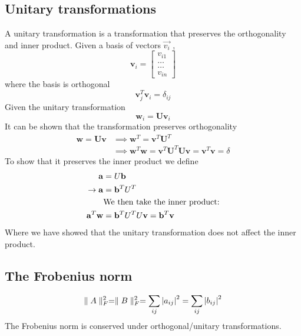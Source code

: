 \documentclass[%
reprint,
amsmath,amssymb,
aps,
]{revtex4-1}
\begin{document}
\subsection{Unitary transformations} \noindent 
A unitary transformation is a transformation that preserves the orthogonality and inner product. Given a basis of vectors $\vec{v_i}$ ,
\begin{equation*}
	\mathbf{v}_i = \begin{bmatrix} v_{i1} \\ \dots \\ \dots \\v_{in} \end{bmatrix}
\end{equation*}
where the basis is orthogonal 
\begin{equation*}
	\mathbf{v}_j^T\mathbf{v}_i = \delta_{ij}
\end{equation*}
Given the unitary transformation 
\begin{equation*}
	\mathbf{w}_i=\mathbf{U}\mathbf{v}_i
\end{equation*}
It can be shown that the transformation preserves orthogonality
\begin{align*}
	\mathbf{w}=\mathbf{U}\mathbf{v} &\implies \mathbf{w}^T=\mathbf{v}^T\mathbf{U}^T \\ &\implies \mathbf{w}^T\mathbf{w} = \mathbf{v}^T\mathbf{U}^T\mathbf{U}\mathbf{v} = \mathbf{v}^T\mathbf{v} = \delta
\end{align*}
To show that it preserves the inner product we define 
\begin{align*}
	\mathbf{a} &= U\mathbf{b} \\
	\rightarrow \mathbf{a} &= \mathbf{b}^TU^T \\
	&\textnormal{We then take the inner product:} \\
	 \mathbf{a}^T\mathbf{w} &= \mathbf{b}^TU^TU\mathbf{v} = \mathbf{b}^T\mathbf{v}
\end{align*}
Where we have showed that the unitary transformation does not affect the inner product. 

\subsection{The Frobenius norm}
\begin{equation}
	\parallel A \parallel_F^2 = \parallel B \parallel_F^2 = \sum_{ij} \abs{a_{ij}}^2 = \sum_{ij} \abs{b_{ij}}^2
\end{equation}
The Frobenius norm is conserved under orthogonal/unitary transformations. 
\end{document}
